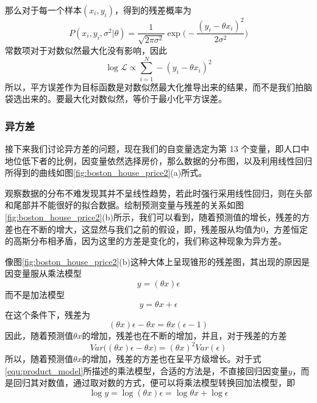 

那么对于每一个样本$(x_i, y_i)$，得到的残差概率为
\begin{equation}
	P(x_i, y_i, \sigma^2|\theta) = \frac{1}{\sqrt{2\pi\sigma^2}}
	\exp\Bigg(-\frac{(y_i - \theta x_i)^2}{2\sigma^2}\Bigg)
\end{equation}
常数项对于对数似然最大化没有影响，因此
\begin{equation}
	\log \mathcal{L} \propto  \sum_{i=1}^N - (y_i - \theta x_i)^2
\end{equation}
所以，平方误差作为目标函数是对数似然最大化推导出来的结果，而不是我们拍脑袋选出来的。要最大化对数似然，等价于最小化平方误差。




\subsubsection{异方差} %
\label{ssub:异方差}
接下来我们讨论异方差的问题，现在我们的自变量选定为第 13 个变量，即⼈口中地位低下者的⽐例，因变量依然选择房价，那么数据的分布图，以及利用线性回归所得到的曲线如图\ref{fig:boston_house_price2}(a)所式。


观察数据的分布不难发现其并不呈线性趋势，若此时强行采用线性回归，则在头部和尾部并不能很好的拟合数据。绘制预测变量与残差的关系如图\ref{fig:boston_house_price2}(b)所示，我们可以看到，随着预测值的增长，残差的方差也在不断的增大，这显然与我们之前的假设，即，残差服从均值为0，方差恒定的高斯分布相矛盾，因为这里的方差是变化的，我们称这种现象为异方差。

像图\ref{fig:boston_house_price2}(b)这种大体上呈现锥形的残差图，其出现的原因是因变量服从乘法模型
\begin{equation}\label{equ:product_model}
	y = (\theta x)\epsilon
\end{equation}
而不是加法模型
\begin{equation}
	y = \theta x + \epsilon
\end{equation}
在这个条件下，残差为
\begin{equation}
	(\theta x)\epsilon - \theta x = \theta x(\epsilon - 1)
\end{equation}
因此，随着预测值$\theta x$的增加，残差也在不断的增加，并且，对于残差的方差
\begin{equation}
	Var\Big((\theta x)\epsilon - \theta x \Big) = (\theta x)^2 Var(\epsilon)
\end{equation}
所以，随着预测值$\theta x$的增加，残差的方差也在呈平方级增长。对于式\ref{equ:product_model}所描述的乘法模型，合适的方法是，不直接回归因变量$y$，而是回归其对数值，通过取对数的方式，便可以将乘法模型转换回加法模型，即
\begin{equation}
	\log y = \log (\theta x)\epsilon = \log\theta x + \log \epsilon
\end{equation}

